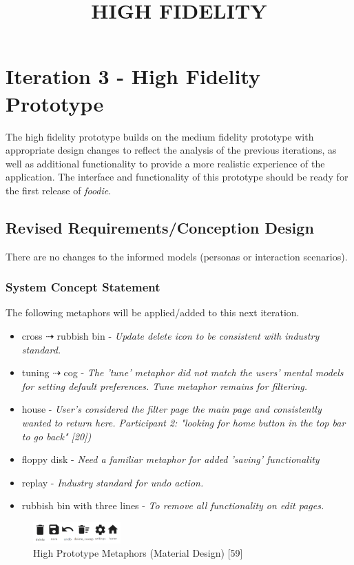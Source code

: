 \documentclass[a4 paper, 12pt]{article}
\title{HIGH FIDELITY}
\begin{document}
    
\section{Iteration 3 - High Fidelity Prototype}
The high fidelity prototype builds on the medium fidelity prototype with appropriate design changes to reflect the analysis of the previous iterations, as well as additional functionality to provide a more realistic experience of the application. The interface and functionality of this prototype should be ready for the first release of \textit{foodie}.

    \subsection{Revised Requirements/Conception Design}
    There are no changes to the informed models (personas or interaction scenarios). 

    \subsubsection{System Concept Statement}    
    The following metaphors will be applied/added to this next iteration.
        \begin{itemize}
            \item cross $\dashrightarrow$ rubbish bin - \textit{Update delete icon to be consistent with industry standard.}
            \item tuning $\dashrightarrow$ cog - \textit{The 'tune' metaphor did not match the users' mental models for setting default preferences. Tune metaphor remains for filtering.}
            \item house - \textit{User's considered the filter page the main page and consistently wanted to return here. Participant 2: "looking for home button in the top bar to go back" [20])}
            \item floppy disk - \textit{Need a familiar metaphor for added 'saving' functionality}
            \item replay - \textit{Industry standard for undo action.}
            \item rubbish bin with three lines - \textit{To remove all functionality on edit pages.}
        \end{itemize}

        \begin{figure} [H]
            \centering
            \includegraphics[width=0.3\textwidth, frame]
                {./High_Fidelity/High_Report/images/high_icons.PNG}  
            \caption{High Prototype Metaphors (Material Design) [59]}
        \end{figure}  
\end{document}
